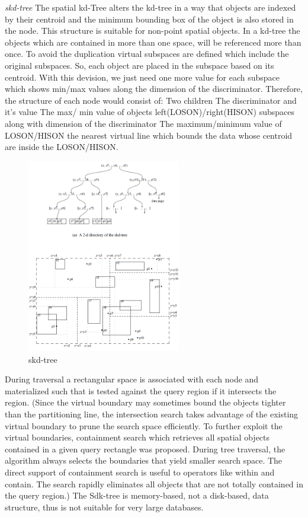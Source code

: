 \documentclass[a4paper,12pt]{article}
\begin{document}
\emph{skd-tree}
The spatial kd-Tree alters the kd-tree in a way that objects are indexed by their centroid and the minimum bounding box of the object is also stored in the node. This structure is suitable for non-point spatial objects. In a kd-tree the objects which are contained in more than one space, will be referenced more than once. To avoid the duplication virtual subspaces are defined which include the original subspaces. So, each object are placed in the subspace based on its centroid.
With this devision, we just need one more value for each subspace which shows min/max values along the dimension of the discriminator. Therefore, the structure of each node would consist of:
Two children
The discriminator and it's value
The max/ min value of objects left(LOSON)/right(HISON) subspaces along with dimension of the discriminator
The maximum/minimum value of LOSON/HISON the nearest virtual line which bounds the data whose centroid are inside the LOSON/HISON.

\begin{figure}
\centering
\includegraphics[width=0.6\textwidth]{skdtree}
\caption{skd-tree}
\label{figskdtree}
\end{figure}

During traversal a rectangular space is associated with each node and materialized  such that is tested against the query region if it intersects the region. 
(Since the virtual boundary may sometimes bound the objects tighter than the partitioning line, the intersection search takes advantage of the existing virtual boundary to prune the search space efficiently. To further exploit the virtual boundaries, containment search which retrieves all spatial objects contained in a given query rectangle was proposed. During tree traversal, the algorithm always selects the boundaries that yield smaller search space. The direct support of containment search is useful to operators like within and contain. The search rapidly eliminates all objects that are not totally contained in the query region.)
The Sdk-tree is memory-based, not a disk-based, data structure, thus is not suitable for very large databases.
\end{document}
